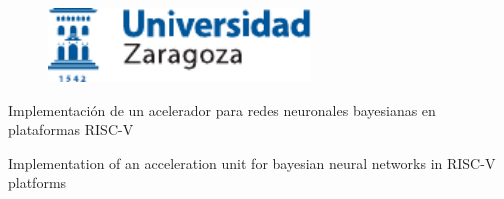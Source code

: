 \documentclass[a4paper,12pt,twoside,hidelinks]{report}
\begin{document}

\begin{titlepage}

\vspace*{-4mm}
\begin{figure}[!h]
  \centering
	\includegraphics[width=69.62mm]{Imagenes/UnizarLogo}
\end{figure}

\vspace*{17mm}

\fontsize{28pt}{28pt}\selectfont
\begin{center}
\setlength{\fboxsep}{3.4mm}
\end{center}

\vspace*{5mm}


\fontsize{20pt}{20pt}\selectfont
\begin{center}
Implementación de un acelerador para redes neuronales bayesianas en plataformas RISC-V
\end{center}
\baselineskip 20pt
\begin{center}
Implementation of an acceleration unit for bayesian neural networks in RISC-V platforms
\end{center}

\vspace*{1cm} 
\baselineskip 36pt
\begin{center}
\fontsize{12pt}{12pt}\selectfont
{}
\vspace*{3.65mm} 
\fontsize{18pt}{18pt}\selectfont
{}
\vspace*{1cm}
\baselineskip 36pt
\fontsize{12pt}{12pt}\selectfont
{}
\vspace*{3.56mm}
\fontsize{14pt}{14pt}\selectfont
{}
\vspace*{1cm}
\baselineskip 36pt
\fontsize{12pt}{12pt}\selectfont
{}
\vspace*{3.56mm}
\fontsize{14pt}{14pt}\selectfont
{}


\end{center}
\end{titlepage}
\end{document}
